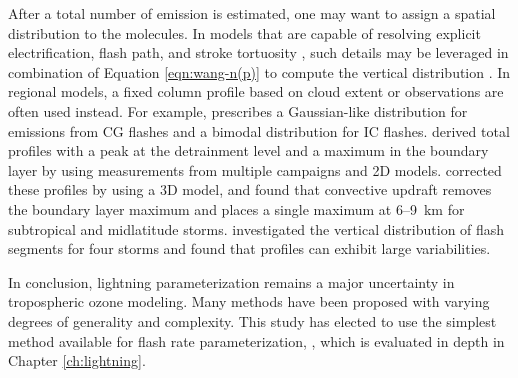 	After a total number of  emission is estimated, one may want to assign a spatial distribution to the molecules. In models that are capable of resolving explicit electrification, flash path, and stroke tortuosity \citep[e.g.][]{Mansell:2002kx}, such details may be leveraged in combination of Equation \ref{eqn:wang-n(p)} to compute the vertical distribution \citep{Barthe:2007fk}. In regional models, a fixed column profile based on cloud extent or observations are often used instead. For example, \citet{Decaria:2000kl} prescribes a Gaussian-like distribution for emissions from CG flashes and a bimodal distribution for IC flashes. \citet{Pickering:1998sh} derived total {\lnox} profiles with a peak at the detrainment level and a maximum in the boundary layer by using measurements from multiple campaigns and 2D models. \citet{Ott:2010lo} corrected these profiles by using a 3D model, and found that convective updraft removes the boundary layer maximum and places a single maximum at 6--9 \,\unit{km} for subtropical and midlatitude storms. \citet{Hansen:2010fk} investigated the vertical distribution of flash segments for four storms and found that profiles can exhibit large variabilities.
	
\quad

\noindent In conclusion, lightning parameterization remains a major uncertainty in tropospheric ozone modeling. Many methods have been proposed with varying degrees of generality and complexity. This study has elected to use the simplest method available for flash rate parameterization, {\ie} \citet{Price:1992wb}, which is evaluated in depth in Chapter \ref{ch:lightning}.